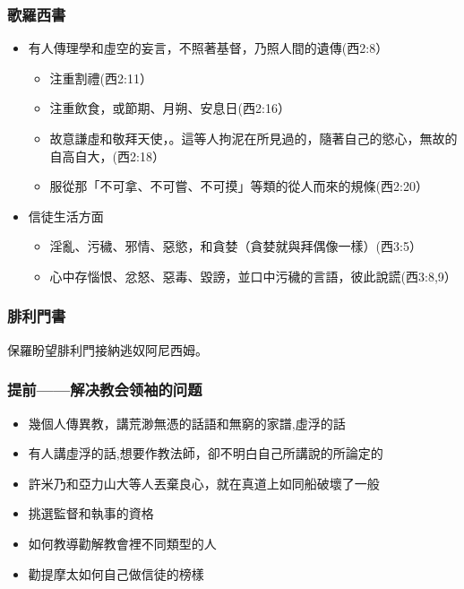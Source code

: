 \subsubsection{歌羅西書}%
\begin{itemize}%
\itemsep-.25em 
\item 有人傳理學和虛空的妄言，不照著基督，乃照人間的遺傳(西2:8）
\begin{itemize}%
\itemsep-.25em 
\item 注重割禮(西2:11）
\item 注重飲食，或節期、月朔、安息日(西2:16）
\item 故意謙虛和敬拜天使，。這等人拘泥在所見過的，隨著自己的慾心，無故的自高自大，(西2:18） 
\item 服從那「不可拿、不可嘗、不可摸」等類的從人而來的規條(西2:20）
\end{itemize}
\item 信徒生活方面
\begin{itemize}%
\itemsep-.25em 
\item 淫亂、污穢、邪情、惡慾，和貪婪（貪婪就與拜偶像一樣）(西3:5）
\item 心中存惱恨、忿怒、惡毒、毀謗，並口中污穢的言語，彼此說謊(西3:8,9）
\end{itemize}
\end{itemize}

\subsubsection{腓利門書}
保羅盼望腓利門接納逃奴阿尼西姆。

\subsubsection{提前——解决教会领袖的问题}
\begin{itemize}%
\itemsep-.25em 
\item 幾個人傳異教，講荒渺無憑的話語和無窮的家譜,虛浮的話 
\item 有人講虛浮的話,想要作教法師，卻不明白自己所講說的所論定的
\item 許米乃和亞力山大等人丟棄良心，就在真道上如同船破壞了一般 
\item 挑選監督和執事的資格 
\item 如何教導勸解教會裡不同類型的人
\item 勸提摩太如何自己做信徒的榜樣
\end{itemize}

